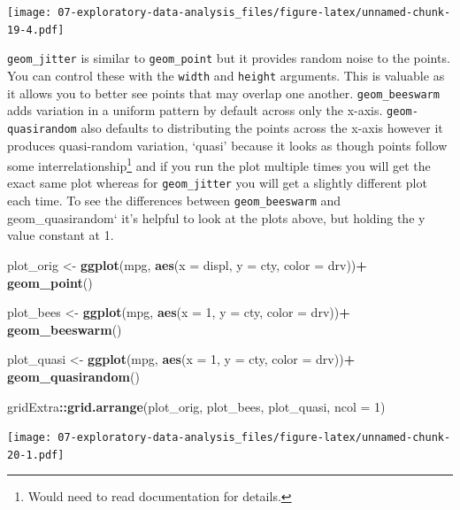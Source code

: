 \documentclass[]{book}
\newenvironment{Shaded}{\begin{snugshade}}{\end{snugshade}}
\newcommand{\DataTypeTok}[1]{\textcolor[rgb]{0.13,0.29,0.53}{#1}}
\newcommand{\DecValTok}[1]{\textcolor[rgb]{0.00,0.00,0.81}{#1}}
\newcommand{\KeywordTok}[1]{\textcolor[rgb]{0.13,0.29,0.53}{\textbf{#1}}}
\newcommand{\NormalTok}[1]{#1}
\newcommand{\OperatorTok}[1]{\textcolor[rgb]{0.81,0.36,0.00}{\textbf{#1}}}
\newcommand{\StringTok}[1]{\textcolor[rgb]{0.31,0.60,0.02}{#1}}
\let\rmarkdownfootnote\footnote%
\def\footnote{\protect\rmarkdownfootnote}
\theoremstyle{definition}
\theoremstyle{definition}
\theoremstyle{definition}
\theoremstyle{remark}
\begin{document}
\texttt{[image: 07-exploratory-data-analysis\_files/figure-latex/unnamed-chunk-19-4.pdf]}

\texttt{geom\_jitter} is similar to \texttt{geom\_point} but it provides
random noise to the points. You can control these with the
\texttt{width} and \texttt{height} arguments. This is valuable as it
allows you to better see points that may overlap one another.
\texttt{geom\_beeswarm} adds variation in a uniform pattern by default
across only the x-axis. \texttt{geom-quasirandom} also defaults to
distributing the points across the x-axis however it produces
quasi-random variation, {`quasi'} because it looks as though points
follow some interrelationship\footnote{Would need to read documentation
  for details.} and if you run the plot multiple times you will get the
exact same plot whereas for \texttt{geom\_jitter} you will get a
slightly different plot each time. To see the differences between
\texttt{geom\_beeswarm} and geom\_quasirandom` it's helpful to look at
the plots above, but holding the y value constant at 1.

\begin{Shaded}
\begin{Highlighting}[]
\NormalTok{plot_orig <-}\StringTok{ }\KeywordTok{ggplot}\NormalTok{(mpg, }\KeywordTok{aes}\NormalTok{(}\DataTypeTok{x =}\NormalTok{ displ, }\DataTypeTok{y =}\NormalTok{ cty, }\DataTypeTok{color =}\NormalTok{ drv))}\OperatorTok{+}
\StringTok{  }\KeywordTok{geom_point}\NormalTok{()}

\NormalTok{plot_bees <-}\StringTok{ }\KeywordTok{ggplot}\NormalTok{(mpg, }\KeywordTok{aes}\NormalTok{(}\DataTypeTok{x =} \DecValTok{1}\NormalTok{, }\DataTypeTok{y =}\NormalTok{ cty, }\DataTypeTok{color =}\NormalTok{ drv))}\OperatorTok{+}
\StringTok{  }\KeywordTok{geom_beeswarm}\NormalTok{()}

\NormalTok{plot_quasi <-}\StringTok{ }\KeywordTok{ggplot}\NormalTok{(mpg, }\KeywordTok{aes}\NormalTok{(}\DataTypeTok{x =} \DecValTok{1}\NormalTok{, }\DataTypeTok{y =}\NormalTok{ cty, }\DataTypeTok{color =}\NormalTok{ drv))}\OperatorTok{+}
\StringTok{  }\KeywordTok{geom_quasirandom}\NormalTok{()}

\NormalTok{gridExtra}\OperatorTok{::}\KeywordTok{grid.arrange}\NormalTok{(plot_orig, plot_bees, plot_quasi, }\DataTypeTok{ncol =} \DecValTok{1}\NormalTok{)}
\end{Highlighting}
\end{Shaded}

\texttt{[image: 07-exploratory-data-analysis\_files/figure-latex/unnamed-chunk-20-1.pdf]}
\end{document}

